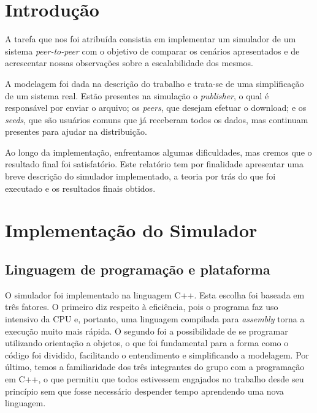 \documentclass[a4paper,10pt]{article}
\begin{document}
\pagebreak

\tableofcontents
\pagebreak

\listoffigures
\pagebreak

\section{Introdução}

A tarefa que nos foi atribuída consistia em implementar um simulador de um sistema \textit{peer-to-peer} com o objetivo de comparar os cenários apresentados e de acrescentar nossas observações sobre a escalabilidade dos mesmos.

A modelagem foi dada na descrição do trabalho e trata-se de uma simplificação de um sistema real. Estão presentes na simulação o \textit{publisher}, o qual é responsável por enviar o arquivo; os \textit{peers}, que desejam efetuar o download; e os \textit{seeds}, que são usuários comuns que já receberam todos os dados, mas continuam presentes para ajudar na distribuição. 

Ao longo da implementação, enfrentamos algumas dificuldades, mas cremos que o resultado final foi satisfatório. Este relatório tem por finalidade apresentar uma breve descrição do simulador implementado, a teoria por trás do que foi executado e os resultados finais obtidos.

\pagebreak

\section{Implementação do Simulador}

\subsection{Linguagem de programação e plataforma}

O simulador foi implementado na linguagem C++. Esta escolha foi baseada em três fatores. O primeiro diz respeito à eficiência, pois o programa faz uso intensivo da CPU e, portanto, uma linguagem compilada para \textit{assembly} torna a execução muito mais rápida. O segundo foi a possibilidade de se programar utilizando orientação a objetos, o que foi fundamental para a forma como o código foi dividido, facilitando o entendimento e simplificando a modelagem. Por último, temos a familiaridade dos três integrantes do grupo com a programação em C++, o que permitiu que todos estivessem engajados no trabalho desde seu princípio sem que fosse necessário despender tempo aprendendo uma nova linguagem.
\end{document}
